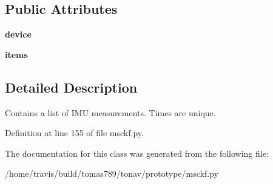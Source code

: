 \subsection*{Public Attributes}
\begin{DoxyCompactItemize}
\item 
\hypertarget{classmsckf_1_1_imu_buffer_a32ca4fadfb0ea149595c2e525359dfd1}{{\bfseries device}}\label{classmsckf_1_1_imu_buffer_a32ca4fadfb0ea149595c2e525359dfd1}

\item 
\hypertarget{classmsckf_1_1_imu_buffer_a30ea8b12a07b5f7e594867741dcae9b7}{{\bfseries items}}\label{classmsckf_1_1_imu_buffer_a30ea8b12a07b5f7e594867741dcae9b7}

\end{DoxyCompactItemize}


\subsection{Detailed Description}
\begin{DoxyVerb}Contains a list of IMU measurements. Times are unique.
\end{DoxyVerb}
 

Definition at line 155 of file msckf.\-py.



The documentation for this class was generated from the following file\-:\begin{DoxyCompactItemize}
\item 
/home/travis/build/tomas789/tonav/prototype/msckf.\-py\end{DoxyCompactItemize}
